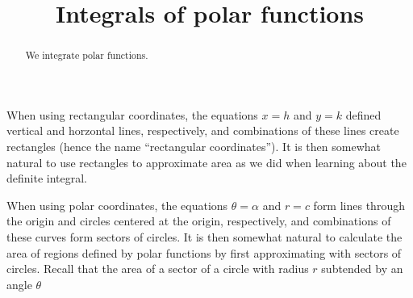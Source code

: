\documentclass{ximera}
\title[Dig-In:]{Integrals of polar functions}
\begin{document}
\begin{abstract}
  We integrate polar functions.
\end{abstract}
\maketitle


When using rectangular coordinates, the equations $x=h$ and $y=k$
defined vertical and horzontal lines, respectively, and combinations
of these lines create rectangles (hence the name ``rectangular
coordinates''). It is then somewhat natural to use rectangles to
approximate area as we did when learning about the definite
integral.

When using polar coordinates, the equations $\theta=\alpha$ and $r=c$
form lines through the origin and circles centered at the origin,
respectively, and combinations of these curves form sectors of
circles. It is then somewhat natural to calculate the area of regions
defined by polar functions by first approximating with sectors of
circles. Recall that the area of a sector of a circle with radius $r$
subtended by an angle $\theta$
\begin{image}
\end{image}
\end{document}
